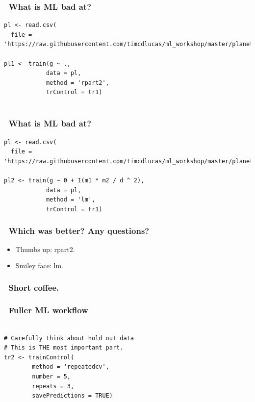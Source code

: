 \documentclass[handout, aspectratio = 169]{beamer}
\begin{document}
\begin{frame}[fragile]
\frametitle{\insertframenumber~What is ML bad at?}
\renewcommand{\FancyVerbFormatLine}[1]{%
   \ifnum\value{FancyVerbLine}=1\color{cyan}#1%
   \else #1\fi}
\begin{Verbatim}
pl <- read.csv(
  file = 'https://raw.githubusercontent.com/timcdlucas/ml_workshop/master/planets.csv')

pl1 <- train(g ~ ., 
            data = pl,
            method = 'rpart2',
            trControl = tr1)


\end{Verbatim}

\end{frame} 


\begin{frame}[fragile]
\frametitle{\insertframenumber~What is ML bad at?}
\renewcommand{\FancyVerbFormatLine}[1]{%
   \ifnum\value{FancyVerbLine}=1\color{cyan}#1%
   \else #1\fi}
\begin{Verbatim}
pl <- read.csv(
  file = 'https://raw.githubusercontent.com/timcdlucas/ml_workshop/master/planets.csv')

pl2 <- train(g ~ 0 + I(m1 * m2 / d ^ 2), 
            data = pl,
            method = 'lm',
            trControl = tr1)

\end{Verbatim}

\end{frame} 



\begin{frame}
\frametitle{\insertframenumber~Which was better? Any questions?}

\begin{itemize}
\item Thumbs up: rpart2.
\item Smiley face: lm.
\end{itemize}
\end{frame} 






\begin{frame}
\frametitle{\insertframenumber~Short coffee.}


\end{frame} 










\begin{frame}[fragile]
\frametitle{\insertframenumber~Fuller ML workflow}
\begin{Verbatim}

# Carefully think about hold out data
# This is THE most important part.
tr2 <- trainControl(
        method = 'repeatedcv',
        number = 5,
        repeats = 3, 
        savePredictions = TRUE)


\end{Verbatim}

\end{frame} 
\end{document}
